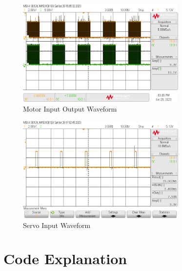 \documentclass[CMPE]{KGCOEReport}
\begin{document}
\begin{figure}[H]
    \centering
    \includegraphics[width=0.75\textwidth]{MotorIO.png}
    \caption{Motor Input Output Waveform}
    \label{fig:motor}
\end{figure}

\begin{figure}[H]
    \centering
    \includegraphics[width=0.75\textwidth]{ServoWave.png}
    \caption{Servo Input Waveform}
    \label{fig:ServoWave}
\end{figure}

\section*{Code Explanation}
\end{document}
